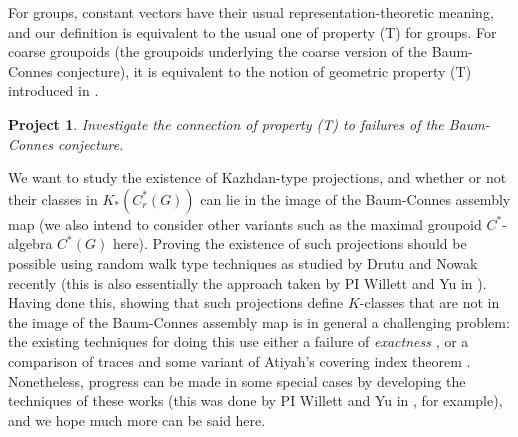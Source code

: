 \documentclass[11pt]{article}
\theoremstyle{plain}
\newtheorem{project}[theorem]{Project}
\theoremstyle{definition}
\newtheorem{definition}[theorem]{Definition}
\theoremstyle{remark}
\begin{document}
For groups, constant vectors have their usual representation-theoretic meaning, and our definition is equivalent to the usual one of property (T) for groups.  For coarse groupoids (the groupoids underlying the coarse version of the Baum-Connes conjecture), it is equivalent to the notion of geometric property (T) introduced in \cite{Willett:2013cr}.   




\begin{project}
Investigate the connection of property (T) to failures of the Baum-Connes conjecture.
\end{project}

We want to study the existence of Kazhdan-type projections, and whether or not their classes in $K_*(C^*_r(G))$ can lie in the image of the Baum-Connes assembly map (we also intend to consider other variants such as the maximal groupoid $C^*$-algebra $C^*(G)$ here).   Proving the existence of such projections should be possible using random walk type techniques as studied by Drutu and Nowak recently \cite{Drutu:2015aa} (this is also essentially the approach taken by PI Willett and Yu in \cite{Willett:2013cr}).  Having done this, showing that such projections define $K$-classes that are not in the image of the Baum-Connes assembly map is in general a challenging problem: the existing techniques for doing this use either a failure of \emph{exactness} \cite{Higson:2002la}, or a comparison of traces and some variant of Atiyah's covering index theorem \cite{Higson:1999km}.  Nonetheless, progress can be made in some special cases by developing the techniques of these works (this was done by PI Willett and Yu in \cite{Willett:2010ud}, for example), and we hope much more can be said here.
\end{document}
